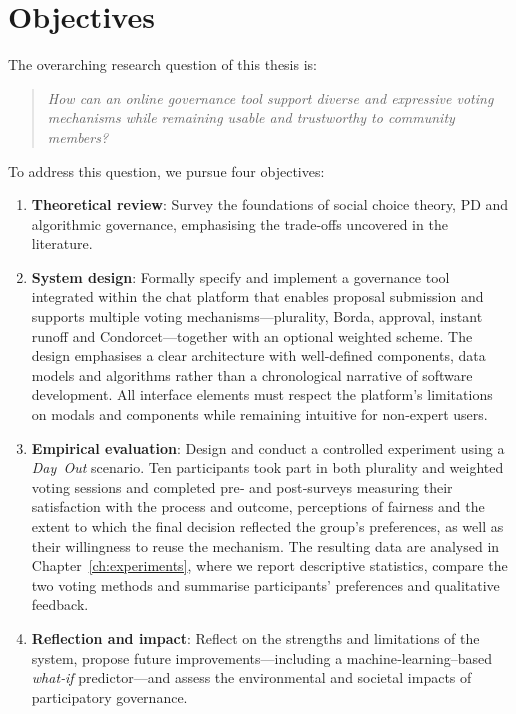 \section{Objectives}

The overarching research question of this thesis is:

\begin{quote}
\emph{How can an online governance tool support diverse and expressive voting mechanisms while remaining usable and trustworthy to community members?}
\end{quote}

To address this question, we pursue four objectives:
\begin{enumerate}
    \item \textbf{Theoretical review}: Survey the foundations of social choice
    theory, PD and algorithmic governance, emphasising the
    trade‑offs uncovered in the literature.
    \item \textbf{System design}: Formally specify and implement a
    governance tool integrated within the chat platform that enables proposal submission and
    supports multiple voting mechanisms—plurality, Borda, approval,
    instant runoff and Condorcet—together with an optional weighted
    scheme.  The design emphasises a clear architecture with
    well‑defined components, data models and algorithms rather than a
    chronological narrative of software development.  All interface
    elements must respect the platform’s limitations on modals and
    components while remaining intuitive for non‑expert users.
    \item \textbf{Empirical evaluation}: Design and conduct a controlled
    experiment using a \emph{Day~Out} scenario.  Ten participants took
    part in both plurality and weighted voting sessions and completed pre‑ and
    post‑surveys measuring their satisfaction with the process and outcome, perceptions of fairness and the extent to which the final decision reflected the group’s preferences, as well as their willingness to reuse the mechanism.  The resulting data are analysed in Chapter~\ref{ch:experiments}, where we report descriptive statistics, compare the two voting methods and summarise participants’ preferences and qualitative feedback.
    \item \textbf{Reflection and impact}: Reflect on the strengths and
    limitations of the system, propose future improvements—including a
    machine‑learning–based \emph{what‑if} predictor—and assess the
    environmental and societal impacts of participatory governance.
\end{enumerate}

